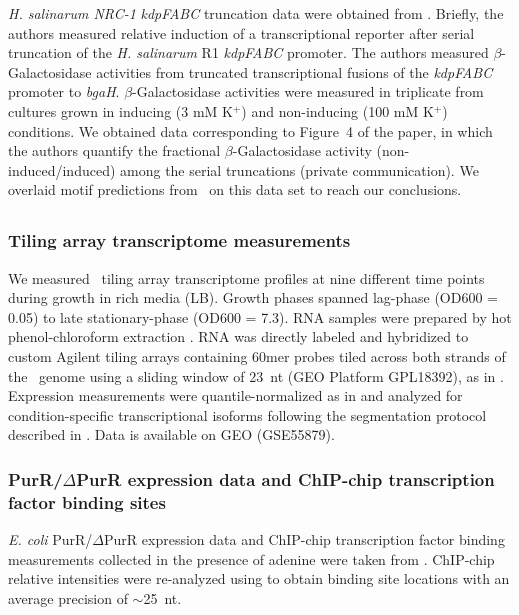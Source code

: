 {\it H. salinarum NRC-1} \textit{kdpFABC} truncation data were obtained from \cite{Kixmueller2011}. Briefly, the authors measured relative induction of a transcriptional reporter after serial truncation of the \textit{H. salinarum} R1 \textit{kdpFABC} promoter. The authors measured $\beta$-Galactosidase activities from truncated transcriptional fusions of the \textit{kdpFABC} promoter to \textit{bgaH}. $\beta$-Galactosidase activities were measured in triplicate from cultures grown in inducing (3 mM K$^{+}$) and non-inducing (100 mM K$^{+}$) conditions. We obtained data corresponding to Figure~4 of the paper, in which the authors quantify the fractional $\beta$-Galactosidase activity (non-induced/induced) among the serial truncations (private communication). We overlaid motif predictions from \egrine~on this data set to reach our conclusions.  

\subsection{\eco}\label{ecodata}

\subsubsection{Tiling array transcriptome measurements}
\label{section:ecoarray}
We measured \eco\ tiling array transcriptome profiles at nine different
time points during growth in rich media (LB). Growth phases spanned lag-phase (OD600 = 0.05) to
late stationary-phase (OD600 = 7.3). RNA samples were prepared by hot phenol-chloroform extraction \cite{Khodursky2003}. RNA was directly labeled and
hybridized to custom Agilent tiling arrays containing 60mer probes
tiled across both strands of the \eco\ genome using a sliding window
of 23~nt (GEO Platform GPL18392), as in \cite{Koide2009}. Expression measurements were quantile-normalized as in \cite{Yoon2011} and analyzed for condition-specific transcriptional
isoforms following the segmentation protocol described
in \cite{Koide2009}. Data is available on GEO (GSE55879).

\subsubsection{PurR/$\Delta$PurR expression data and ChIP-chip transcription factor binding sites} 

{\it E. coli} PurR/$\Delta$PurR expression data and ChIP-chip
transcription factor binding measurements collected in the presence of
adenine were taken from \cite{Cho2011a}. ChIP-chip relative
intensities were re-analyzed using
{} \cite{Reiss2008} to obtain binding site locations
with an average precision of $\sim$25~nt.

